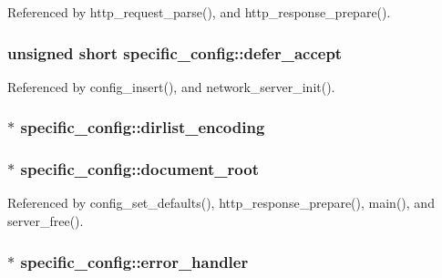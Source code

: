 Referenced by http\-\_\-request\-\_\-parse(), and http\-\_\-response\-\_\-prepare().

\hypertarget{structspecific__config_a0add70e0d4abb5e9ab8148334779071b}{
\subsubsection[{defer\-\_\-accept}]{\setlength{\rightskip}{0pt plus 5cm}unsigned short specific\-\_\-config\-::defer\-\_\-accept}}\label{structspecific__config_a0add70e0d4abb5e9ab8148334779071b}


Referenced by config\-\_\-insert(), and network\-\_\-server\-\_\-init().

\hypertarget{structspecific__config_ab4f64099f9a1bad5f3e327b0cde06729}{
\subsubsection[{dirlist\-\_\-encoding}]{$\ast$ specific\-\_\-config\-::dirlist\-\_\-encoding}}\label{structspecific__config_ab4f64099f9a1bad5f3e327b0cde06729}
\hypertarget{structspecific__config_adce38ac3a259651eea450f7aba2b1b8d}{
\subsubsection[{document\-\_\-root}]{$\ast$ specific\-\_\-config\-::document\-\_\-root}}\label{structspecific__config_adce38ac3a259651eea450f7aba2b1b8d}


Referenced by config\-\_\-set\-\_\-defaults(), http\-\_\-response\-\_\-prepare(), main(), and server\-\_\-free().

\hypertarget{structspecific__config_aaa57502eab1aab0856f2f540218a9893}{
\subsubsection[{error\-\_\-handler}]{$\ast$ specific\-\_\-config\-::error\-\_\-handler}}\label{structspecific__config_aaa57502eab1aab0856f2f540218a9893}


